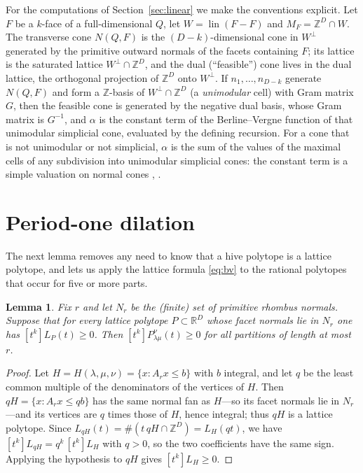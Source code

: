 \documentclass[11pt]{amsart}
\newtheorem{lemma}[theorem]{Lemma}
\theoremstyle{definition}
\newcommand{\Z}{\mathbb{Z}}
\newcommand{\R}{\mathbb{R}}
\newcommand{\lam}{\lambda}
\begin{document}
For the computations of Section~\ref{sec:linear} we make the conventions
explicit. Let $F$ be a $k$-face of a full-dimensional $Q$, let $W=\operatorname{lin}(F-F)$
and $M_F=\Z^{D}\cap W$. The transverse cone $N(Q,F)$ is the $(D-k)$-dimensional
cone in $W^{\perp}$ generated by the primitive outward normals of the facets
containing $F$; its lattice is the saturated lattice $W^{\perp}\cap\Z^{D}$, and
the dual (``feasible'') cone lives in the dual lattice, the orthogonal
projection of $\Z^{D}$ onto $W^{\perp}$. If $n_1,\dots,n_{D-k}$ generate
$N(Q,F)$ and form a $\Z$-basis of $W^{\perp}\cap\Z^{D}$ (a \emph{unimodular}
cell) with Gram matrix $G$, then the feasible cone is generated by the negative
dual basis, whose Gram matrix is $G^{-1}$, and $\alpha$ is the constant term of
the Berline--Vergne function of that unimodular simplicial cone, evaluated by
the defining recursion. For a cone that is not unimodular or not simplicial,
$\alpha$ is the sum of the values of the maximal cells of any subdivision into
unimodular simplicial cones: the constant term is a simple valuation on normal
cones \cite[Cor.~24]{BerlineVergne}, \cite[Lemma~3.3]{CastilloLiu}.

\section{Period-one dilation}\label{sec:dilation}

The next lemma removes any need to know that a hive polytope is a lattice
polytope, and lets us apply the lattice formula \eqref{eq:bv} to the rational
polytopes that occur for five or more parts.

\begin{lemma}\label{lem:dilation}
Fix $r$ and let $N_r$ be the (finite) set of primitive rhombus normals. Suppose
that for every \emph{lattice} polytope $P\subset\R^{D}$ whose facet normals lie
in $N_r$ one has $[t^{k}]L_{P}(t)\ge 0$. Then $[t^{k}]P^{\nu}_{\lam\mu}(t)\ge 0$
for all partitions of length at most $r$.
\end{lemma}

\begin{proof}
Let $H=H(\lam,\mu,\nu)=\{x:A_rx\le b\}$ with $b$ integral, and let $q$ be the
least common multiple of the denominators of the vertices of $H$. Then
$qH=\{x:A_rx\le qb\}$ has the same normal fan as $H$---so its facet normals lie
in $N_r$---and its vertices are $q$ times those of $H$, hence integral; thus $qH$
is a lattice polytope. Since $L_{qH}(t)=\#(t\,qH\cap\Z^{D})=L_H(qt)$, we have
$[t^{k}]L_{qH}=q^{k}\,[t^{k}]L_{H}$ with $q>0$, so the two coefficients have the
same sign. Applying the hypothesis to $qH$ gives $[t^{k}]L_H\ge 0$.
\end{proof}
\end{document}
